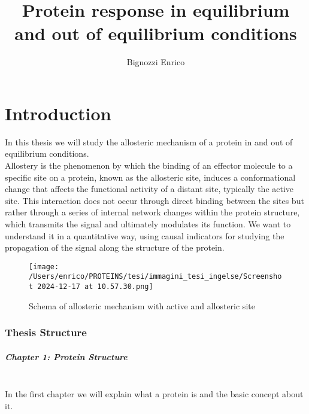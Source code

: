 \documentclass[English, Lau, oneside]{sapthesis}
\title{Protein response in equilibrium and out of equilibrium conditions}
\author{Bignozzi Enrico}
\begin{document}
\maketitle
{}
\tableofcontents



    

\dedication{}

\newpage
\null
\thispagestyle{empty}
\newpage



\chapter{Introduction}
\noindent In this thesis we will study the allosteric mechanism of a protein in and out of equilibrium conditions.\\
Allostery is the phenomenon by which the binding of an effector molecule to a specific site on a protein, known as the allosteric site, induces a conformational change that affects the functional activity of a distant site, typically the active site. This interaction does not occur through direct binding between the sites but rather through a series of internal network changes within the protein structure, which transmits the signal and ultimately modulates its function.
We want to understand it in a quantitative way, using causal indicators for studying the propagation of the signal along the structure of the protein.
\begin{figure}[H]
    \centering
    \texttt{[image: /Users/enrico/PROTEINS/tesi/immagini\_tesi\_ingelse/Screenshot 2024-12-17 at 10.57.30.png]}
    \caption{Schema of allosteric mechanism with active and allosteric site}
\end{figure}

\subsection{Thesis Structure}

\paragraph{Chapter 1: Protein Structure} \\
In the first chapter we will explain what a protein is and the basic concept about it.
\end{document}
